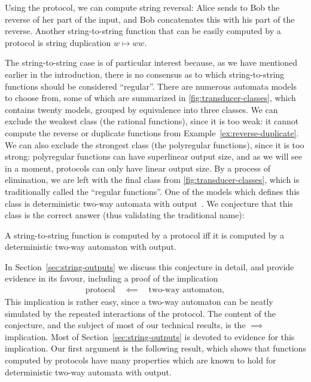 \begin{myexample}\label{ex:reverse-duplicate}
    Using the protocol, we can compute string reversal: Alice sends to Bob the reverse of her part of the input, and  Bob concatenates this with  his part of the reverse. Another string-to-string function that can be easily computed by a protocol is string duplication $w \mapsto ww$. 
\end{myexample}

The string-to-string case is of particular interest because, as we have mentioned earlier in the introduction, there is no consensus as to  which string-to-string functions should be considered ``regular''. There are numerous automata models to choose from, some of which are summarized in \cref{fig:transducer-classes}, which contains twenty models, grouped by equivalence into three classes. We can exclude the weakest class (the rational functions), since it is too weak: it  cannot compute the reverse or duplicate functions from Example~\ref{ex:reverse-duplicate}. We can also exclude the strongest class (the polyregular functions), since it is too strong: polyregular functions can have superlinear output size, and as we will see in a moment, protocols can only have linear output size. By a process of elimination, we are left with the final  class from \cref{fig:transducer-classes}, which is traditionally called the ``regular functions''. One of the models which defines this class is  deterministic two-way automata with output~\cite{shepherdson1959reduction}. We conjecture  that this class     is the correct answer (thus validating the traditional name): 

\begin{conjecture}\label{conj:protocol-regular-string-to-string}
    A string-to-string function is computed by a protocol iff it is computed by a deterministic two-way automaton with output.
\end{conjecture}

In Section~\ref{sec:string-outputs} we discuss this conjecture in detail, and provide evidence in its favour, including a proof of the  implication 
\begin{align*}
\text{protocol} \quad \impliedby \quad \text{two-way automaton},
\end{align*} 
This implication is rather easy, since a two-way automaton can be neatly simulated by the repeated interactions of the protocol. The content of the conjecture, and the subject of most of our technical results, is the $\implies$ implication. Most of Section~\ref{sec:string-outputs} is devoted to evidence for this implication. 
Our first argument  is the following result, which shows that functions computed  by protocols have many properties which are known to hold for deterministic two-way automata with output.


